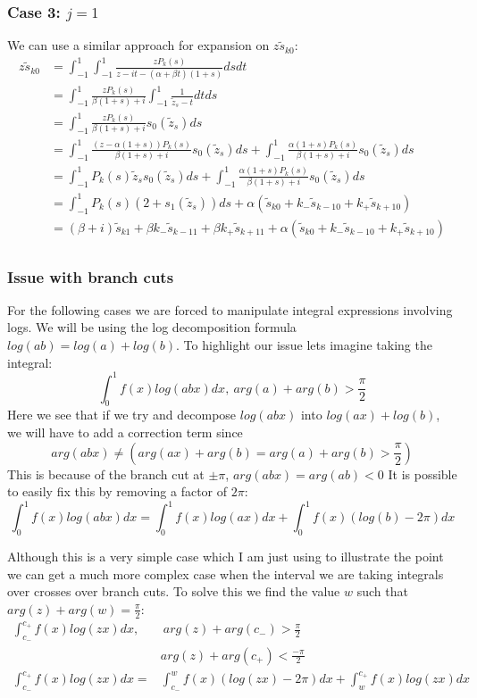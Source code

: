 \documentclass{article}
\begin{document}
\subsubsection{Case 3: $j=1$}
We can use a similar approach for expansion on $z\tilde{s}_{k0}$:
\begin{align}
    z\tilde{s}_{k0} &= \int_{-1}^1\int_{-1}^1\frac{zP_k(s)}{z-it-(\alpha+\beta t)(1+s)}dsdt\\
    &=\int_{-1}^1\frac{zP_k(s)}{\beta(1+s)+i}\int_{-1}^1\frac{1}{\tilde{z}_s-t}dtds\\
    &=\int_{-1}^1\frac{zP_k(s)}{\beta(1+s)+i}s_0(\tilde{z}_s)ds\\
    &=\int_{-1}^1\frac{(z-\alpha(1+s))P_k(s)}{\beta(1+s)+i}s_0(\tilde{z}_s)ds
    +\int_{-1}^1\frac{\alpha(1+s)P_k(s)}{\beta(1+s)+i}s_0(\tilde{z}_s)ds\\
    &=\int_{-1}^1P_k(s)\tilde{z}_ss_0(\tilde{z}_s)ds
    +\int_{-1}^1\frac{\alpha(1+s)P_k(s)}{\beta(1+s)+i}s_0(\tilde{z}_s)ds\\
    &=\int_{-1}^1P_k(s)(2+s_1(\tilde{z}_s))ds+\alpha(\tilde{s}_{k0}+k_-\tilde{s}_{k-10}+k_+\tilde{s}_{k+10})\\
    &=(\beta+i)\tilde{s}_{k1}+\beta k_-\tilde{s}_{k-11}+\beta k_+\tilde{s}_{k+11}
    +\alpha(\tilde{s}_{k0}+k_-\tilde{s}_{k-10}+k_+\tilde{s}_{k+10})\\
\end{align}

\subsubsection{Issue with branch cuts}
For the following cases we are forced to manipulate integral expressions involving logs.
We will be using the log decomposition formula $log(ab)=log(a)+log(b)$.
To highlight our issue lets imagine taking the integral:
$$\int_{0}^1 f(x)log(abx)dx,\:arg(a)+arg(b)>\frac{\pi}{2}$$
Here we see that if we try and decompose $log(abx)$ into $log(ax)+log(b)$,
we will have to add a correction term since
$$arg(abx)\neq (arg(ax)+arg(b)=arg(a)+arg(b)>\frac{\pi}{2})$$
This is because of the branch cut at $\pm\pi$, $arg(abx)=arg(ab)<0$
It is possible to easily fix this by removing a factor of $2\pi$:
$$\int_{0}^1 f(x)log(abx)dx = \int_{0}^1 f(x)log(ax)dx+\int_{0}^1 f(x)(log(b)-2\pi)dx$$

Although this is a very simple case which I am just using to illustrate the point we can get a much more complex case when the interval we are taking integrals over crosses over branch cuts.
To solve this we find the value $w$ such that $arg(z)+arg(w)=\frac{\pi}{2}$:
\begin{align}
    \int_{c_-}^{c_+}f(x)log(zx)dx,&\:arg(z)+arg(c_-)>\frac{\pi}{2}\\
    &arg(z)+arg(c_+)<\frac{-\pi}{2}\\
    \int_{c_-}^{c_+}f(x)log(zx)dx=&\int_{c_-}^wf(x)(log(zx)-2\pi)dx
    +\int_w^{c_+}f(x)log(zx)dx
\end{align}
\end{document}
